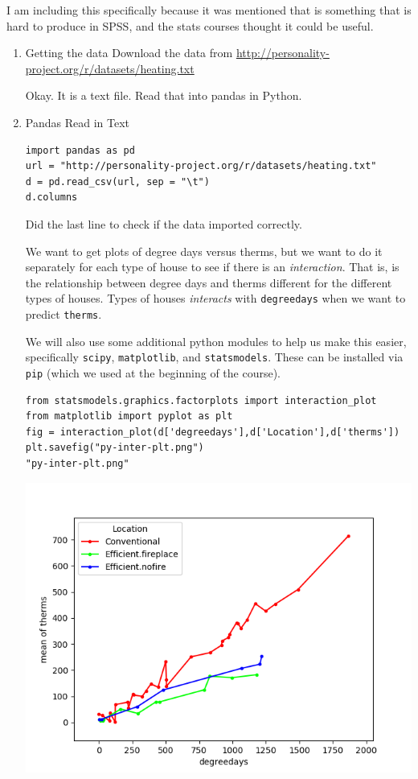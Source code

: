 \documentclass{article}
\begin{document}
I am including this specifically because it was mentioned that is something that is hard to produce in SPSS, and the stats courses thought it could be useful. 
\begin{enumerate}
\item Getting the data
\label{sec:org7e7a9a3}
Download the data from \url{http://personality-project.org/r/datasets/heating.txt}

Okay. It is a text file. Read that into pandas in Python.
\item Pandas Read in Text
\label{sec:org57cc57b}
\begin{verbatim}
import pandas as pd
url = "http://personality-project.org/r/datasets/heating.txt"
d = pd.read_csv(url, sep = "\t")
d.columns
\end{verbatim}

Did the last line to check if the data imported correctly. 

We want to get plots of degree days versus therms, but we want to do it separately for each type of house to see if there is an \emph{interaction}. That is, is the relationship between degree days and therms different for the different types of houses. Types of houses \emph{interacts} with \texttt{degreedays} when we want to predict \texttt{therms}. 

We will also use some additional python modules to help us make this easier, specifically \texttt{scipy}, \texttt{matplotlib}, and \texttt{statsmodels}. These can be installed via \texttt{pip} (which we used at the beginning of the course). 

\begin{verbatim}
from statsmodels.graphics.factorplots import interaction_plot
from matplotlib import pyplot as plt
fig = interaction_plot(d['degreedays'],d['Location'],d['therms'])
plt.savefig("py-inter-plt.png")
"py-inter-plt.png"
\end{verbatim}

\begin{center}
\includegraphics[width=.9\linewidth]{py-inter-plt.png}
\end{center}


\end{enumerate}
\end{document}
